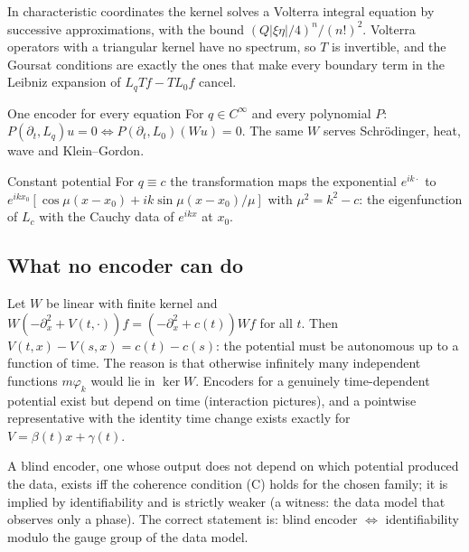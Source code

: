 \begin{intuition}
In characteristic coordinates the kernel solves a Volterra integral equation by successive approximations, with the bound $(Q|\xi\eta|/4)^n/(n!)^2$. Volterra operators with a triangular kernel have no spectrum, so $T$ is invertible, and the Goursat conditions are exactly the ones that make every boundary term in the Leibniz expansion of $L_qTf-TL_0f$ cancel.
\end{intuition}

\begin{corollary}{One encoder for every equation  \proved}\label{cor:encc1}
For $q\in C^\infty$ and every polynomial $P$: $P(\partial_t,L_q)u=0\iff P(\partial_t,L_0)(Wu)=0$. The same $W$ serves Schr\"odinger, heat, wave and Klein--Gordon.
\end{corollary}

\begin{example}{Constant potential}
For $q\equiv c$ the transformation maps the exponential $e^{ik\cdot}$ to $e^{ikx_0}[\cos\mu(x-x_0)+ik\sin\mu(x-x_0)/\mu]$ with $\mu^2=k^2-c$: the eigenfunction of $L_c$ with the Cauchy data of $e^{ikx}$ at $x_0$.
\end{example}

\subsection{What no encoder can do}

\begin{theorem}\label{thm:encp0}
Let $W$ be linear with finite kernel and $W(-\partial_x^2+V(t,\cdot))f=(-\partial_x^2+c(t))Wf$ for all $t$. Then $V(t,x)-V(s,x)=c(t)-c(s)$: the potential must be autonomous up to a function of time. The reason is that otherwise infinitely many independent functions $m\varphi_k$ would lie in $\ker W$. Encoders for a genuinely time-dependent potential exist but depend on time (interaction pictures), and a pointwise representative with the identity time change exists exactly for $V=\beta(t)x+\gamma(t)$.
\end{theorem}

\begin{theorem}\label{lem:encn1}
A blind encoder, one whose output does not depend on which potential produced the data, exists iff the coherence condition (C) holds for the chosen family; it is implied by identifiability and is strictly weaker (a witness: the data model that observes only a phase). The correct statement is: blind encoder $\iff$ identifiability modulo the gauge group of the data model.
\end{theorem}

